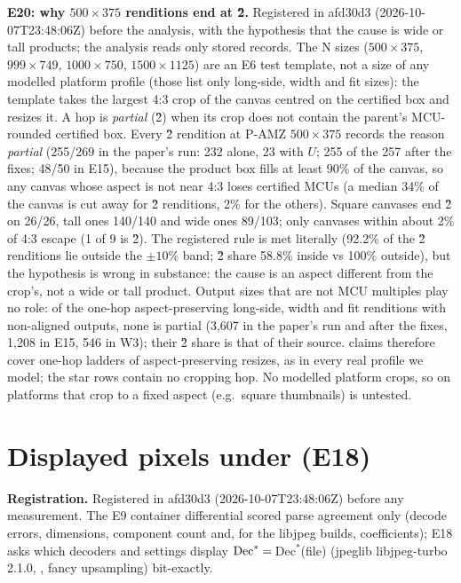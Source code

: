 \documentclass[10pt]{article}
\begin{document}
\textbf{E20: why $500\times375$ renditions end at \G{2}.} Registered in afd30d3 (2026-10-07T23:48:06Z) before the analysis, with
the hypothesis that the cause is wide or tall products; the analysis reads only stored records. The N sizes ($500\times375$, $999\times749$, $1000\times750$, $1500\times1125$) are
an E6 test template, not a size of any modelled platform profile (those list only long-side, width and fit sizes): the
template takes the largest 4:3 crop of the canvas centred on the certified box and resizes it. A hop is
\emph{partial} (\G{2}) when its crop does not contain the parent's MCU-rounded certified box. Every \G{2} rendition at
P-AMZ $500\times375$ records the reason \emph{partial} (255/269 in the paper's run: 232 alone, 23 with $U$; 255 of
the 257 after the fixes; 48/50 in E15), because the product box fills at least 90\% of the canvas, so any canvas whose aspect is
not near 4:3 loses certified MCUs (a median 34\% of the canvas is cut away for \G{2} renditions, 2\% for the others).
Square canvases end \G{2} on 26/26, tall ones 140/140 and wide ones 89/103; only canvases within about 2\% of 4:3 escape
(1 of 9 is \G{2}). The registered rule is met literally (92.2\% of the \G{2} renditions lie outside the $\pm10\%$ band; \G{2}
share 58.8\% inside vs 100\% outside), but the hypothesis is wrong in substance: the cause is an aspect different from
the crop's, not a wide or tall product. Output sizes that are not MCU multiples play no role: of the one-hop
aspect-preserving long-side, width and fit renditions with non-aligned outputs, none is partial (3,607 in the paper's
run and after the fixes, 1,208 in E15, 546 in W3); their \G{2} share is that of their source.  claims therefore
cover one-hop ladders of aspect-preserving resizes, as in every real profile we model; the  star rows contain no
cropping hop. No modelled platform crops, so  on platforms that crop to a fixed aspect (e.g.\ square thumbnails)
is untested.

\section{Displayed pixels under  (E18)}
\label{sec:b1}
\textbf{Registration.} Registered in afd30d3 (2026-10-07T23:48:06Z) before any measurement. The E9 container differential scored
parse agreement only (decode errors, dimensions, component count and, for the libjpeg builds, coefficients); E18 asks which decoders and settings display
$\mathrm{Dec}^{*}=$\,Dec$^*$(file) (jpeglib libjpeg-turbo 2.1.0, \islow{}, fancy upsampling) bit-exactly.
\end{document}
